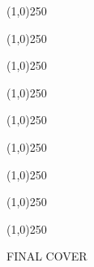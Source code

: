 \documentclass[letterpaper,10pt]{article}
\begin{document}
\cleardoublepage


\tableofcontents

\cleardoublepage

\pagestyle{plain}


\begin{center}
\line(1,0){250}
\end{center}


\begin{center}
\line(1,0){250}
\end{center}


\begin{center}
\line(1,0){250}
\end{center}


\begin{center}
\line(1,0){250}
\end{center}


\begin{center}
\line(1,0){250}
\end{center}


\begin{center}
\line(1,0){250}
\end{center}


\begin{center}
\line(1,0){250}
\end{center}


\begin{center}
\line(1,0){250}
\end{center}


\begin{center}
\line(1,0){250}
\end{center}


\newpage

\begin{titlepage}
FINAL COVER
\end{titlepage}
\end{document}
